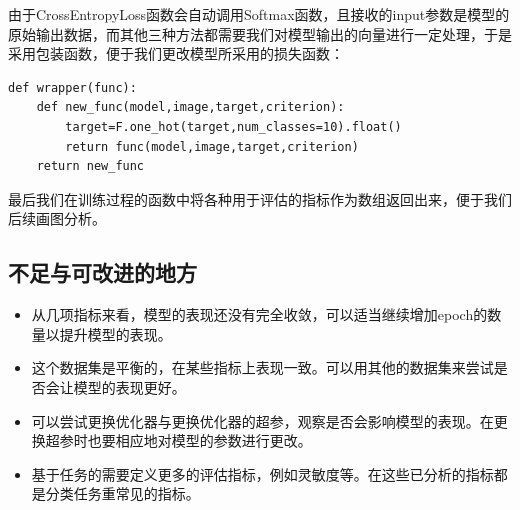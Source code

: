 \documentclass{article}
\begin{document}
由于CrossEntropyLoss函数会自动调用Softmax函数，且接收的input参数是模型的原始输出数据，而其他三种方法都需要我们对模型输出的向量进行一定处理，于是采用包装函数，便于我们更改模型所采用的损失函数：
\begin{lstlisting}
def wrapper(func):
    def new_func(model,image,target,criterion):
        target=F.one_hot(target,num_classes=10).float()
        return func(model,image,target,criterion)
    return new_func
\end{lstlisting}

最后我们在训练过程的函数中将各种用于评估的指标作为数组返回出来，便于我们后续画图分析。

\subsection{不足与可改进的地方}
\begin{itemize}
    \item 从几项指标来看，模型的表现还没有完全收敛，可以适当继续增加epoch的数量以提升模型的表现。
    \item 这个数据集是平衡的，在某些指标上表现一致。可以用其他的数据集来尝试是否会让模型的表现更好。
    \item 可以尝试更换优化器与更换优化器的超参，观察是否会影响模型的表现。在更换超参时也要相应地对模型的参数进行更改。
    \item 基于任务的需要定义更多的评估指标，例如灵敏度等。在这些已分析的指标都是分类任务重常见的指标。
\end{itemize}
\end{document}
